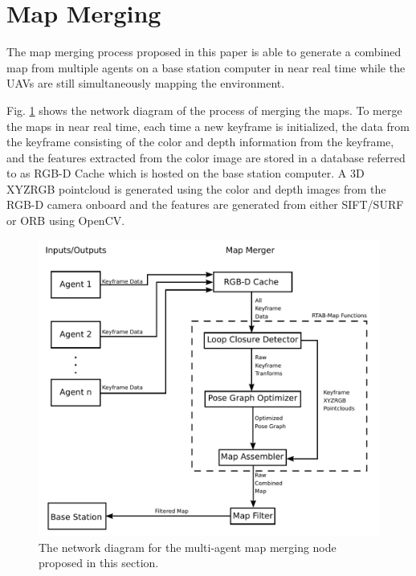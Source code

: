\documentclass[letterpaper, 10 pt, conference]{ieeeconf}  %
\begin{document}
\section{Map Merging}\label{merge}

The map merging process proposed in this paper is able to generate a combined map from multiple agents on a base station computer in near real time while the UAVs are still simultaneously mapping the environment.

Fig. \ref{fig:map_merge} shows the network diagram of the process of merging the maps. To merge the maps in near real time, each time a new keyframe is initialized, the data from the keyframe consisting of the color and depth information from the keyframe, and the features extracted from the color image are stored in a database referred to as RGB-D Cache which is hosted on the base station computer. A 3D XYZRGB pointcloud is generated using the color and depth images from the RGB-D camera onboard and the features are generated from either SIFT/SURF or ORB using OpenCV.

\begin{figure}
\centering
\includegraphics[width=0.7\linewidth]{map_merger_network}
\caption{The network diagram for the multi-agent map merging node proposed in this section.}
\label{fig:map_merge}
\end{figure}
\end{document}
